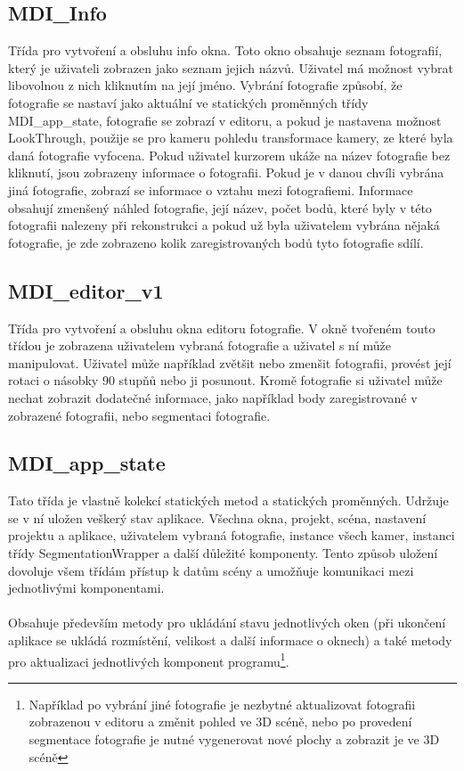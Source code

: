 \documentclass[11pt,twoside,a4paper]{book}
\begin{document}
\subsection{MDI\_Info}
Třída pro vytvoření a obsluhu info okna. Toto okno obsahuje seznam fotografií, který je uživateli zobrazen jako seznam jejich názvů. Uživatel má možnost vybrat libovolnou z nich kliknutím na její jméno. Vybrání fotografie způsobí, že fotografie se nastaví jako aktuální ve statických proměnných třídy MDI\_app\_state, fotografie se zobrazí v editoru, a pokud je nastavena možnost LookThrough, použije se pro kameru pohledu transformace kamery, ze které byla daná fotografie vyfocena. Pokud uživatel kurzorem ukáže na název fotografie bez kliknutí, jsou zobrazeny informace o fotografii. Pokud je v danou chvíli vybrána jiná fotografie, zobrazí se informace o vztahu mezi fotografiemi. Informace obsahují zmenšený náhled fotografie, její název, počet bodů, které byly v této fotografii nalezeny při rekonstrukci a pokud už byla uživatelem vybrána nějaká fotografie, je zde zobrazeno kolik zaregistrovaných bodů tyto fotografie sdílí.

\subsection{MDI\_editor\_v1}
Třída pro vytvoření a obsluhu okna editoru fotografie. V okně tvořeném touto třídou je zobrazena uživatelem vybraná fotografie a uživatel s ní může manipulovat. Uživatel může například zvětšit nebo zmenšit fotografii, provést její rotaci o násobky 90 stupňů nebo ji posunout. Kromě fotografie si uživatel může nechat zobrazit dodatečné informace, jako například body zaregistrované v zobrazené fotografii, nebo segmentaci fotografie. 
\paragraph{}

\subsection{MDI\_app\_state}
Tato třída je vlastně kolekcí statických metod a statických proměnných. Udržuje se v ní uložen veškerý stav aplikace. Všechna okna, projekt, scéna, nastavení projektu a aplikace, uživatelem vybraná fotografie, instance všech kamer, instanci třídy SegmentationWrapper a další důležité komponenty. Tento způsob uložení dovoluje všem třídám přístup k datům scény a umožňuje komunikaci mezi jednotlivými komponentami.
\paragraph{}
Obsahuje především metody pro ukládání stavu jednotlivých oken (při ukončení aplikace se ukládá rozmístění, velikost a další informace o oknech) a také metody pro aktualizaci jednotlivých komponent programu\footnote{Například po vybrání jiné fotografie je nezbytné aktualizovat fotografii zobrazenou v editoru a změnit pohled ve 3D scéně, nebo po provedení segmentace fotografie je nutné vygenerovat nové plochy a zobrazit je ve 3D scéně}.
\end{document}
